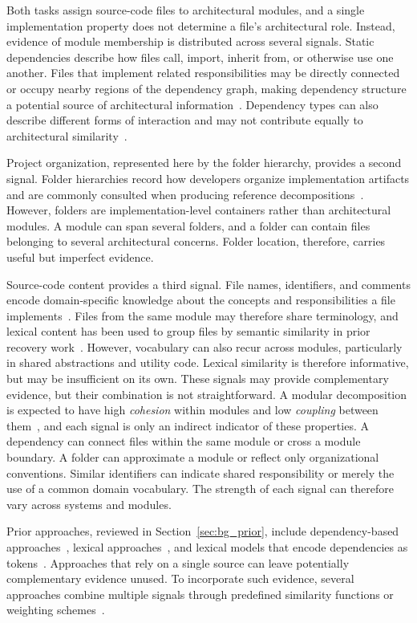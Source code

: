 Both tasks assign source-code files to architectural modules, and a single implementation property does not determine a file's architectural role. Instead, evidence of module membership is distributed across several signals. Static dependencies describe how files call, import, inherit from, or otherwise use one another. Files that implement related responsibilities may be directly connected or occupy nearby regions of the dependency graph, making dependency structure a potential source of architectural information~\cite{negar}. Dependency types can also describe different forms of interaction and may not contribute equally to architectural similarity~\cite{edge_weights}.

Project organization, represented here by the folder hierarchy, provides a second signal. Folder hierarchies record how developers organize implementation artifacts and are commonly consulted when producing reference decompositions~\cite{garcia2013}. However, folders are implementation-level containers rather than architectural modules. A module can span several folders, and a folder can contain files belonging to several architectural concerns. Folder location, therefore, carries useful but imperfect evidence.

Source-code content provides a third signal. File names, identifiers, and comments encode domain-specific knowledge about the concepts and responsibilities a file implements~\cite{sarif}. Files from the same module may therefore share terminology, and lexical content has been used to group files by semantic similarity in prior recovery work~\cite{arc,zbr}. However, vocabulary can also recur across modules, particularly in shared abstractions and utility code. Lexical similarity is therefore informative, but may be insufficient on its own.
These signals may provide complementary evidence, but their combination is not straightforward. A modular decomposition is expected to have high \emph{cohesion} within modules and low \emph{coupling} between them~\cite{bunch_sahc_nahc}, and each signal is only an indirect indicator of these properties. A dependency can connect files within the same module or cross a module boundary. A folder can approximate a module or reflect only organizational conventions. Similar identifiers can indicate shared responsibility or merely the use of a common domain vocabulary. The strength of each signal can therefore vary across systems and modules.

Prior approaches, reviewed in Section~\ref{sec:bg_prior}, include dependency-based approaches~\cite{bunch_sahc_nahc,acdc,wca,negar}, lexical approaches~\cite{zbr,arc}, and lexical models that encode dependencies as tokens~\cite{olsson2022automatically}. Approaches that rely on a single source can leave potentially complementary evidence unused. To incorporate such evidence, several approaches combine multiple signals through predefined similarity functions or weighting schemes~\cite{sarif,sade,sc_misra}.

